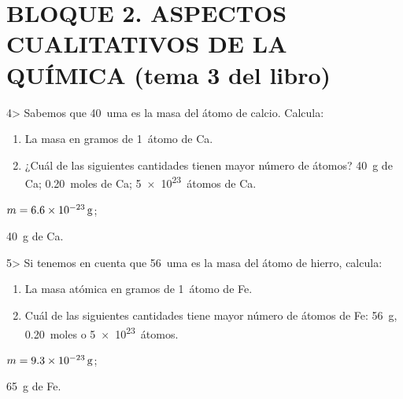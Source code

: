 \documentclass{article}
\begin{document}
\section{BLOQUE 2. ASPECTOS CUALITATIVOS DE LA QUÍMICA (tema 3 del libro)}

\begin{exercise}
4> Sabemos que \SI{40}{uma} es la masa del átomo de calcio. Calcula:
  \begin{enumerate}
    \item La masa en gramos de \SI{1}{átomo} de Ca.
    \item ¿Cuál de las siguientes cantidades tienen mayor número de átomos? \SI{40}{g} de Ca; \SI{0,20}{moles} de Ca; \SI{5e23}{átomos} de Ca.
  \end{enumerate}
\end{exercise}

\begin{solution}
  \begin{enumerate*}
    \item $m = \SI{6,6E-23}{\gram}$;
    \item \SI{40}{\gram} de Ca.
  \end{enumerate*}
\end{solution}

\begin{exercise}
  5> Si tenemos en cuenta que \SI{56}{uma} es la masa del átomo de hierro, calcula:
  \begin{enumerate}
    \item La masa atómica en gramos de \SI{1}{átomo} de Fe.
    \item Cuál de las siguientes cantidades tiene mayor número de átomos de Fe: \SI{56}{\gram}, \SI{0,20}{moles} o \SI{5e23}{átomos}.
  \end{enumerate}
\end{exercise}

\begin{solution}
  \begin{enumerate*}
    \item $m = \SI{9,3E-23}{\gram}$;
    \item \SI{65}{\gram} de Fe.
  \end{enumerate*}
\end{solution}
\end{document}
